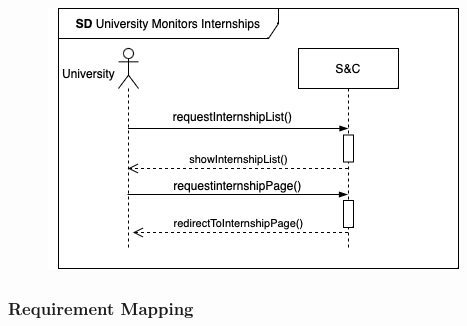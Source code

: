 \begin{enumerate}[label=\textbf{[US\arabic*]}, left = 0pt, align = left, resume]
\begin{longtable}{|l|p{11cm}|}
            \end{longtable}
            
            \begin{figure}[h!]
                \centering        \includegraphics{RASD/Images/UseCases/UniversityMonitorsInternships.drawio.png}
                \label{fig:example}
            \end{figure}

        \end{enumerate}
        
\newpage

\subsubsection{Requirement Mapping}

